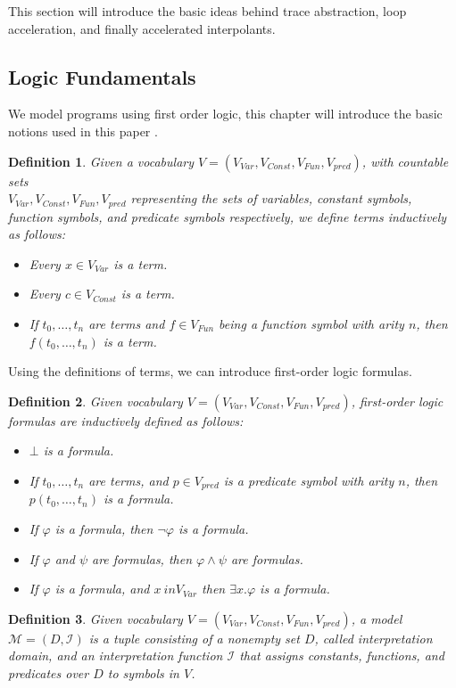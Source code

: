 \documentclass{article}
\newcommand{\Var}{\ensuremath{\mathit{Var}}\xspace}
\newcommand{\vocab}[1]{\ensuremath{V_{\mathit{#1}}}\xspace}
\newcommand{\interpret}{\ensuremath{\mathcal{I}}\xspace}
\newtheorem{mydef}{Definition}
\begin{document}
This section will introduce the basic ideas behind trace abstraction, loop acceleration, and finally accelerated interpolants.

\subsection{Logic Fundamentals}
We model programs using first order logic, this chapter will introduce the basic notions used in this paper \cite{Almeida2011}.
\begin{mydef}
	Given a vocabulary $V = (\vocab{Var}, \vocab{Const}, \vocab{Fun}, \vocab{pred})$, with countable sets \\ $\vocab{\Var}, \vocab{Const}, \vocab{Fun}, \vocab{pred}$ representing the sets of variables, constant symbols, function symbols, and predicate symbols respectively, we define terms inductively as follows:
	\begin{itemize}
		\item Every $x \in \vocab{Var}$ is a term.
		\item Every $c \in \vocab{Const}$ is a term.
		\item If $t_0, \ldots, t_n$ are terms and $f \in \vocab{Fun}$ being a function symbol with arity $n$, then $f(t_0, \ldots, t_n)$ is a term.
	\end{itemize}
\end{mydef}
Using the definitions of terms, we can introduce first-order logic formulas.

\begin{mydef}
	Given vocabulary $V = (\vocab{Var}, \vocab{Const}, \vocab{Fun}, \vocab{pred})$, first-order logic formulas are inductively defined as follows:
	\begin{itemize}
		\item $\bot$ is a formula.
		\item If  $t_0, \ldots, t_n$ are terms, and $p \in \vocab{pred}$ is a predicate symbol with arity $n$, then $p(t_0, \ldots, t_n)$ is a formula.
		\item If $\varphi$ is a formula, then $\neg \varphi$ is a formula.
		\item If $\varphi$ and $\psi$ are formulas, then $\varphi \land \psi$ are formulas.
		\item If $\varphi$ is a formula, and $x \ in \vocab{Var}$ then $\exists x. \varphi$ is a formula.
	\end{itemize}
\end{mydef}

\begin{mydef}
	Given vocabulary $V = (\vocab{Var}, \vocab{Const}, \vocab{Fun}, \vocab{pred})$, a model $\mathcal{M} = (D, \interpret)$ is a tuple consisting of a nonempty set $D$, called interpretation domain, and an interpretation function \interpret that assigns constants, functions, and predicates over $D$ to symbols in $V$.
\end{mydef}
\end{document}

